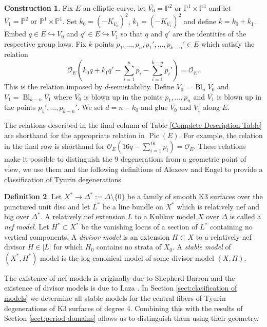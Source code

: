 \documentclass[a4paper]{amsart}
\theoremstyle{definition}
\newtheorem{defn}{Definition}[section]
\newtheorem{construct}[defn]{Construction}
\theoremstyle{plain}
\theoremstyle{remark}
\newcommand{\PS}{\mathbb{P}}
\begin{document}
\begin{construct}\label{Tyurin constructions}
Fix $E$ an elliptic curve, let $\overline{V_0} = \PS^2 \text{ or }\PS^1\times\PS^1$ and let $\overline{V_1} = \PS^2 \text{ or }\PS^1\times\PS^1$. Set $k_0=(-K_{\overline{V_0}})^2$, $k_1= (-K_{\overline{V_1}})^2$ and define $k=k_0+k_1$. Embed $q\in E \hookrightarrow \overline{V_0}$ and $q'\in E\hookrightarrow \overline{V_1}$ so that $q$ and $q'$ are the identities of the respective group laws. Fix $k$ points $p_1,\dots, p_{n}, p_1',\dots, p_{k-n}'\in E$ which satisfy the relation
$$\mathcal{O}_E\left(k_0q+k_1q'-\sum_{i=1}^np_i-\sum_{i=1}^{k-n}p_i'\right)=\mathcal{O}_E.$$
This is the relation imposed by $d$-semistability. Define $V_0 = \operatorname{Bl}_n\overline{V_0}$ and $V_1 = \operatorname{Bl}_{k-n}\overline{V_1}$ where $\overline{V_0}$ is blown up in the points $p_1,\dots,p_n$ and $\overline{V_1}$ is blown up in the points $p_1',\dots,p_{k-n}'$. We set $d=n-k_0$ and glue $V_0$ and $V_1$ along $E$.
\end{construct}


The relations described in the final column of Table \ref{Complete Description Table} are shorthand for the appropriate relation in $\operatorname{Pic}(E)$. For example, the relation in the final row is shorthand for $\mathcal{O}_E(16q-\sum_{i=1}^{16}p_i)=\mathcal{O}_E$. These relations make it possible to distinguish the 9 degenerations from a geometric point of view, we use them and the following definitions of Alexeev and Engel \cite{AE23} to provide a classification of Tyurin degenerations.

\begin{defn}
Let $X^*\rightarrow\Delta^*:=\Delta\setminus\{0\}$ be a family of smooth K3 surfaces over the punctured unit disc and let $L^*$ be a line bundle on $X^*$ which is relatively nef and big over $\Delta^*$. A relatively nef extension $L$ to a Kulikov model $X$ over $\Delta$ is called a \emph{nef model}. Let $H^*\subset X^*$ be the vanishing locus of a section of $L^*$ containing no vertical components. A \emph{divisor model} is an extension $H \subset X$ to a relatively nef divisor $H\in|L|$ for which $H_0$ contains no strata of $X_0$. A \emph{stable model} of $(X^*,H^*)$ model is the log canonical model of some divisor model $(X,H)$.
\end{defn}

The existence of nef models is originally due to Shepherd-Barron \cite{SB83} and the existence of divisor models is due to Laza \cite{Laza16}. In Section \ref{sect:clasification of models} we determine all stable models for the central fibers of Tyurin degenerations of K3 surfaces of degree 4. Combining this with the results of Section \ref{sect:period domains} allows us to distinguish them using their geometry.
\end{document}
